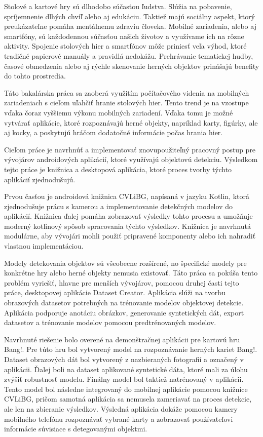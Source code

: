 Stolové a kartové hry sú dlhodobo súčasťou ľudstva. Slúžia na pobavenie, spríjemnenie dlhých chvíľ alebo aj edukáciu. Taktiež majú sociálny aspekt, ktorý preukázateľne pomáha mentálnemu zdraviu človeka. Mobilné zariadenia, alebo aj smartfóny, sú každodennou súčasťou našich životov a využívame ich na rôzne aktivity. Spojenie stolových hier a smartfónov môže priniesť veľa výhod, ktoré tradičné papierové manuály a pravidlá nedokážu. Prehrávanie tematickej hudby, časové obmedzenia alebo aj rýchle skenovanie herných objektov prinášajú benefity do tohto prostredia.

Táto bakalárska práca sa zaoberá využitím počítačového videnia na mobilných zariadeniach s cieľom uľahčiť hranie stolových hier. Tento trend je na vzostupe vďaka čoraz vyššiemu výkonu mobilných zariadení. Vďaka tomu je možné vytvárať aplikácie, ktoré rozpoznávajú herné objekty, napríklad karty, figúrky, ale aj kocky, a poskytujú hráčom dodatočné informácie počas hrania hier.

Cieľom práce je navrhnúť a implementovať znovupoužiteľný pracovný postup pre vývojárov androidových aplikácií, ktoré využívajú objektovú detekciu. Výsledkom tejto práce je knižnica a desktopová aplikácia, ktoré proces tvorby týchto aplikácií zjednodušujú.

Prvou časťou je androidová knižnica CVLiBG, napísaná v jazyku Kotlin, ktorá zjednodušuje prácu s kamerou a implementovanie detekčných modelov do aplikácií. Knižnica ďalej pomáha zobrazovať výsledky tohto procesu a umožňuje moderný kotlinový spôsob spracovania týchto výsledkov. Knižnica je navrhnutá modulárne, aby vývojári mohli použiť pripravené komponenty alebo ich nahradiť vlastnou implementáciou.

Modely detekovania objektov sú všeobecne rozšírené, no špecifické modely pre konkrétne hry alebo herné objekty nemusia existovať. Táto práca sa pokúša tento problém vyriešiť, hlavne pre menších vývojárov, pomocou druhej časti tejto práce, desktopovej aplikácie Dataset Creator. Aplikácia slúži na tvorbu obrazových datasetov potrebných na trénovanie modelov objektovej detekcie. Aplikácia podporuje anotáciu obrázkov, generovanie syntetických dát, export datasetov a trénovanie modelov pomocou predtrénovaných modelov.

Navrhnuté riešenie bolo overené na demonštračnej aplikácii pre kartovú hru Bang!. Pre túto hru bol vytvorený model na rozpoznávanie herných kariet Bang!. Dataset obrazových dát bol vytvorený z nazbieraných fotografií a označený v aplikácii. Ďalej boli na dataset aplikované syntetické dáta, ktoré mali za úlohu zvýšiť robustnosť modelu. Finálny model bol taktiež natrénovaný v aplikácii. Tento model bol následne integrovaný do mobilnej aplikácie pomocou knižnice CVLiBG, pričom samotná aplikácia sa nemusela zameriavať na proces detekcie, ale len na zbieranie výsledkov. Výsledná aplikácia dokáže pomocou kamery mobilného telefónu rozpoznávať vybrané karty a zobrazovať používateľovi informácie súvisiace s detegovanými objektmi.

